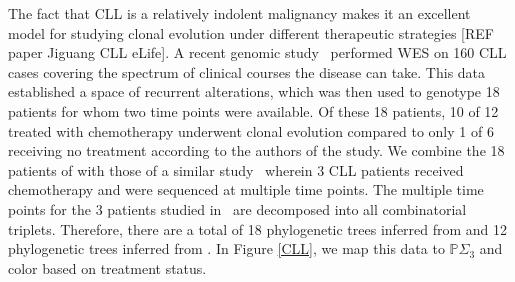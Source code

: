 \documentclass[a4paper,11pt]{article}
\begin{document}
The fact that CLL is a relatively indolent malignancy makes it an excellent model for studying clonal evolution under different therapeutic strategies [REF paper Jiguang CLL eLife].  
A recent genomic study~\cite{landau2013evolution} performed WES on 160 CLL cases covering the spectrum of clinical courses the disease can take.
This data established a space of recurrent alterations, which was then used to genotype 18 patients for whom two time points were available.
Of these 18 patients, 10 of 12 treated with chemotherapy underwent clonal evolution compared to only 1 of 6 receiving no treatment according to the authors of the study.
We combine the 18 patients of \cite{landau2013evolution} with those of a similar study~\cite{schuh2012monitoring} wherein 3 CLL patients received chemotherapy and were sequenced at multiple time points.
The multiple time points for the 3 patients studied in~\cite{schuh2012monitoring} are decomposed into all combinatorial triplets.
Therefore, there are a total of 18 phylogenetic trees inferred from \cite{landau2013evolution} and 12 phylogenetic trees inferred from \cite{schuh2012monitoring}.
In Figure \ref{CLL}, we map this data to $\mathbb{P}\Sigma_3$ and color based on treatment status.
\end{document}
